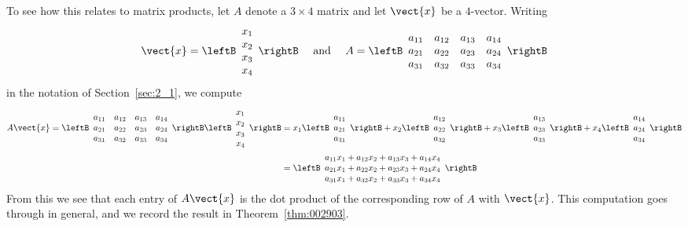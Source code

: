 \noindent To see how this relates to matrix products, let $A$ denote a $3 \times 4$ matrix and let $\vect{x}$ be a $4$-vector. Writing
\begin{equation*}
\vect{x} = \leftB \begin{array}{c}
x_{1} \\
x_{2} \\
x_{3} \\
x_{4}
\end{array} \rightB \quad \mbox{ and } \quad
A = \leftB \begin{array}{cccc}
a_{11} & a_{12} & a_{13} & a_{14} \\
a_{21} & a_{22} & a_{23} & a_{24} \\
a_{31} & a_{32} & a_{33} & a_{34}
\end{array} \rightB 
\end{equation*}
in the notation of Section~\ref{sec:2_1}, we compute
\begin{align*}
A\vect{x} = \leftB \begin{array}{cccc}
a_{11} & a_{12} & a_{13} & a_{14} \\
a_{21} & a_{22} & a_{23} & a_{24} \\
a_{31} & a_{32} & a_{33} & a_{34}
\end{array} \rightB \leftB \begin{array}{c}
x_{1} \\
x_{2} \\
x_{3} \\
x_{4}
\end{array} \rightB &= x_{1} \leftB \begin{array}{c}
a_{11} \\
a_{21} \\
a_{31}
\end{array} \rightB + x_{2} \leftB \begin{array}{c}
a_{12} \\
a_{22} \\
a_{32}
\end{array} \rightB + x_{3} \leftB \begin{array}{c}
a_{13} \\
a_{23} \\
a_{33}
\end{array} \rightB + x_{4} \leftB \begin{array}{c}
a_{14} \\
a_{24} \\
a_{34}
\end{array} \rightB \\
&= \leftB \begin{array}{c}
a_{11}x_{1} + a_{12}x_{2} + a_{13}x_{3} + a_{14}x_{4} \\
a_{21}x_{1} + a_{22}x_{2} + a_{23}x_{3} + a_{24}x_{4} \\
a_{31}x_{1} + a_{32}x_{2} + a_{33}x_{3} + a_{34}x_{4}
\end{array} \rightB
\end{align*}
From this we see that each entry of $A\vect{x}$ is the dot product of the corresponding row of $A$ with $\vect{x}$. This computation goes through in general, and we record the result in Theorem~\ref{thm:002903}.


